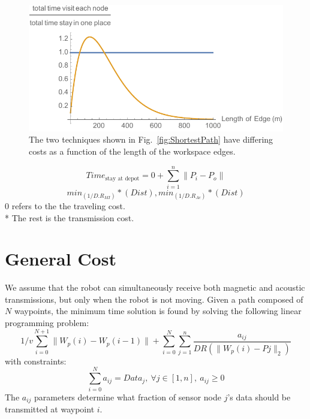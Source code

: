 \documentclass{article}
\begin{document}
\begin{figure}[htb]
\begin{center}
	\includegraphics[width=0.8\columnwidth]{CompareVisitEachToComm}
\end{center}
\caption{ 
 The two techniques shown in Fig.\ \ref{fig:ShortestPath} have differing costs as a function of the length of the workspace edges.
\label{fig:CompareTwoPathTechniques}}
\end{figure}


\begin{equation}
    \label{TimeEqn_Stationary}
    Time_{\textrm{stay at depot}} = 0 + \sum_{i=1}^{n} \|P_{i}-P_{o}\| 
    \end{equation} 
\begin{equation}
    \label{Transmission}
    min_{(1/D.R_{MI})}*(Dist),min_{(1/D.R_{Ac})}*(Dist)  
\end{equation}
0 refers to the the traveling cost.\\*
The rest is the transmission cost.

\section{General Cost}
We assume that the robot can simultaneously receive both magnetic and acoustic transmissions, but only when the robot is not moving.
Given a path composed of $N$ waypoints, the minimum time solution is found by solving the following linear programming problem:
\label{GeneralCost_SingleMode}
\begin{equation}
1/v \sum_{i=0}^{N+1} \|W_{p}(i)-W_{p}(i-1)\|+\sum_{i=0}^{N}\sum_{j=1}^{n}  \frac{ a_{ij}}{DR(\|W_{p}(i)-P{j}\|_2)}
\end{equation}
with constraints:
\label{GeneralCostSingle_Constraints}
\begin{equation}
\sum_{i=0}^{N} a_{ij} = Data_j,~ \forall j \in [1,n], ~
 a_{ij}\geq 0
\end{equation}
The $a_{ij}$ parameters determine what fraction of sensor node $j$'s data should be transmitted at waypoint $i$.
\end{document}
